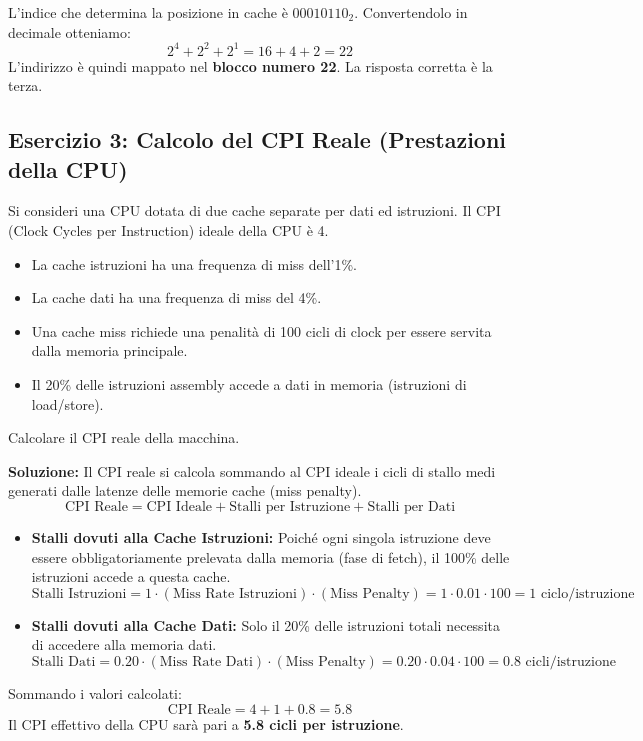 \documentclass[12pt, a4paper]{article}
\begin{document}
L'indice che determina la posizione in cache è $00010110_2$. Convertendolo in decimale otteniamo:
$$2^4 + 2^2 + 2^1 = 16 + 4 + 2 = 22$$
L'indirizzo è quindi mappato nel \textbf{blocco numero 22}. La risposta corretta è la terza.

\subsection{Esercizio 3: Calcolo del CPI Reale (Prestazioni della CPU)}
Si consideri una CPU dotata di due cache separate per dati ed istruzioni. Il CPI (Clock Cycles per Instruction) ideale della CPU è 4. 
\begin{itemize}
    \item La cache istruzioni ha una frequenza di miss dell'1\%.
    \item La cache dati ha una frequenza di miss del 4\%.
    \item Una cache miss richiede una penalità di 100 cicli di clock per essere servita dalla memoria principale.
    \item Il 20\% delle istruzioni assembly accede a dati in memoria (istruzioni di load/store).
\end{itemize}
Calcolare il CPI reale della macchina.

\newpage

\textbf{Soluzione:}
Il CPI reale si calcola sommando al CPI ideale i cicli di stallo medi generati dalle latenze delle memorie cache (miss penalty).
$$\text{CPI Reale} = \text{CPI Ideale} + \text{Stalli per Istruzione} + \text{Stalli per Dati}$$

\begin{itemize}
    \item \textbf{Stalli dovuti alla Cache Istruzioni:} Poiché ogni singola istruzione deve essere obbligatoriamente prelevata dalla memoria (fase di fetch), il 100\% delle istruzioni accede a questa cache.
    $$\text{Stalli Istruzioni} = 1 \cdot (\text{Miss Rate Istruzioni}) \cdot (\text{Miss Penalty}) = 1 \cdot 0.01 \cdot 100 = 1 \text{ ciclo/istruzione}$$
    
    \item \textbf{Stalli dovuti alla Cache Dati:} Solo il 20\% delle istruzioni totali necessita di accedere alla memoria dati.
    $$\text{Stalli Dati} = 0.20 \cdot (\text{Miss Rate Dati}) \cdot (\text{Miss Penalty}) = 0.20 \cdot 0.04 \cdot 100 = 0.8 \text{ cicli/istruzione}$$
\end{itemize}

Sommando i valori calcolati:
$$\text{CPI Reale} = 4 + 1 + 0.8 = 5.8$$
Il CPI effettivo della CPU sarà pari a \textbf{5.8 cicli per istruzione}.
\end{document}
